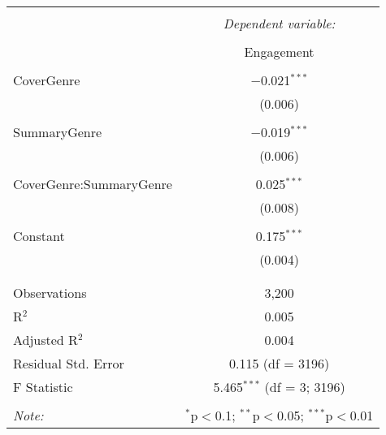 \documentclass[
]{article}
\begin{document}
\begin{table}[!htbp] \centering 
  \caption{} 
  \label{} 
\begin{tabular}{@{\extracolsep{5pt}}lc} 
\\[-1.8ex]\hline 
\hline \\[-1.8ex] 
 & \multicolumn{1}{c}{\textit{Dependent variable:}} \\ 
\cline{2-2} 
\\[-1.8ex] & Engagement \\ 
\hline \\[-1.8ex] 
 CoverGenre & $-$0.021$^{***}$ \\ 
  & (0.006) \\ 
  & \\ 
 SummaryGenre & $-$0.019$^{***}$ \\ 
  & (0.006) \\ 
  & \\ 
 CoverGenre:SummaryGenre & 0.025$^{***}$ \\ 
  & (0.008) \\ 
  & \\ 
 Constant & 0.175$^{***}$ \\ 
  & (0.004) \\ 
  & \\ 
\hline \\[-1.8ex] 
Observations & 3,200 \\ 
R$^{2}$ & 0.005 \\ 
Adjusted R$^{2}$ & 0.004 \\ 
Residual Std. Error & 0.115 (df = 3196) \\ 
F Statistic & 5.465$^{***}$ (df = 3; 3196) \\ 
\hline 
\hline \\[-1.8ex] 
\textit{Note:}  & \multicolumn{1}{r}{$^{*}$p$<$0.1; $^{**}$p$<$0.05; $^{***}$p$<$0.01} \\ 
\end{tabular} 
\end{table}
\end{document}
